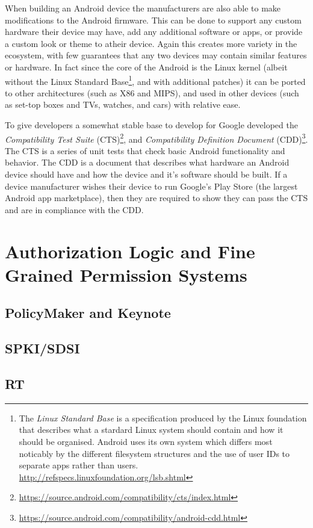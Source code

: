 \documentclass[thesis.tex]{subfiles}
\begin{document}
When building an Android device the manufacturers are also able to make
modifications to the Android firmware. This can be done to support any custom
hardware their device may have, add any additional software or apps, or provide
a custom look or theme to atheir device. Again this creates more variety in the
ecosystem, with few guarantees that any two devices may contain similar features
or hardware. In fact since the core of the Android is the Linux kernel (albeit
without the Linux Standard Base\footnote{The \emph{Linux Standard Base} is a
  specification produced by the Linux foundation that describes what a stardard
  Linux system should contain and how it should be organised. Android uses its own
  system which differs most noticably by the different filesystem structures and
  the use of user IDs to separate apps rather than users.
  \url{http://refspecs.linuxfoundation.org/lsb.shtml}}, and with additional
patches) it can be ported to other architectures (such as X86 and MIPS), and
used in other devices (such as set-top boxes and TVs, watches, and cars) with
relative ease.

To give developers a somewhat stable base to develop for Google developed the
\emph{Compatibility Test Suite}
(CTS)\footnote{\url{https://source.android.com/compatibility/cts/index.html}},
and \emph{Compatibility Definition Document}
(CDD)\footnote{\url{https://source.android.com/compatibility/android-cdd.html}}.
The CTS is a series of unit tests that check basic Android functionality and
behavior. The CDD is a document that describes what hardware an Android device
should have and how the device and it's software should be built. If a device
manufacturer wishes their device to run Google's Play Store (the largest Android
app marketplace), then they are required to show they can pass the CTS and are
in compliance with the CDD.

\section{Authorization Logic and Fine Grained Permission Systems}
\label{sec:authorization-logic}

\subsection{PolicyMaker and Keynote}
\subsection{SPKI/SDSI}
\subsection{RT}
\end{document}
